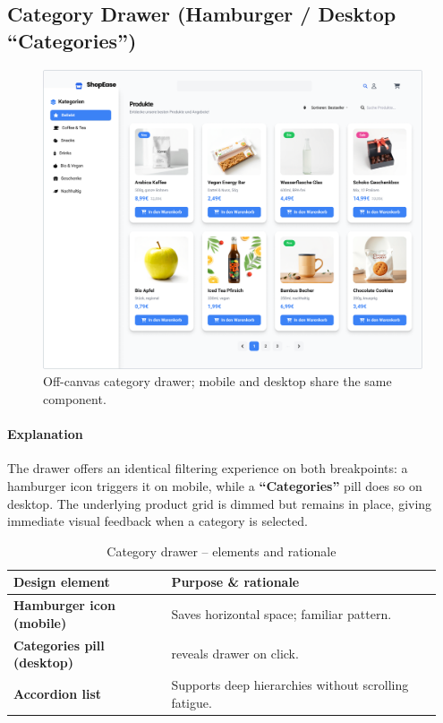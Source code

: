 \documentclass[12pt]{article}
\begin{document}
	\subsection{Category Drawer (Hamburger / Desktop “Categories”)}\label{subsec:category-drawer-(hamburger-/-desktop-categories)}

	\begin{figure}[H]
		\centering
		\includegraphics[width=\linewidth]{pictures/main/categories_Figma}%
		\caption{Off-canvas category drawer; mobile and desktop share the same component.}
		\label{fig:ui-category-drawer}
	\end{figure}

	\paragraph{Explanation}
	The drawer offers an identical filtering experience on both breakpoints:
	a hamburger icon triggers it on mobile, while a \textbf{“Categories”} pill does so on
	desktop.
	The underlying product grid is dimmed but remains in place, giving
	immediate visual feedback when a category is selected.

	\begin{table}[H]
		\centering
		\caption{Category drawer – elements and rationale}
		\label{tab:category-elements}
		\begin{tabular}{p{0.35\linewidth} p{0.60\linewidth}}
			\hline
			\textbf{Design element} 				& Purpose \& rationale \\ \hline
			\textbf{Hamburger icon (mobile)} 		& Saves horizontal space; familiar pattern. \\
			\textbf{Categories pill (desktop)} 		& reveals drawer on click. \\
			\textbf{Accordion list}          		& Supports deep hierarchies without scrolling fatigue. \\
			\hline
		\end{tabular}
	\end{table}
\end{document}
